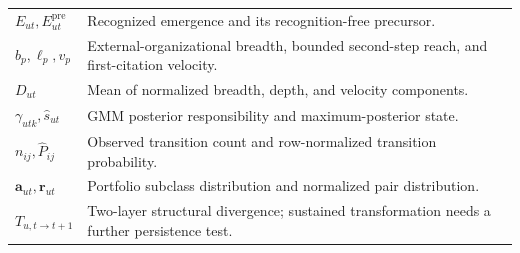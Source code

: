 \begin{longtable}{P{2.85cm}P{10.9cm}}
$E_{ut},E^{\mathrm{pre}}_{ut}$ & Recognized emergence and its recognition-free precursor.\\
$b_p,\ell_p,v_p$ & External-organizational breadth, bounded second-step reach, and first-citation velocity.\\
$D_{ut}$ & Mean of normalized breadth, depth, and velocity components.\\
$\gamma_{utk},\widehat s_{ut}$ & GMM posterior responsibility and maximum-posterior state.\\
$n_{ij},\widehat P_{ij}$ & Observed transition count and row-normalized transition probability.\\
$\mathbf{a}_{ut},\mathbf{r}_{ut}$ & Portfolio subclass distribution and normalized pair distribution.\\
$T_{u,t\rightarrow t+1}$ & Two-layer structural divergence; sustained transformation needs a further persistence test.\\
\bottomrule
\end{longtable}
\endgroup


\clearpage\printbibliography[title={References}]

